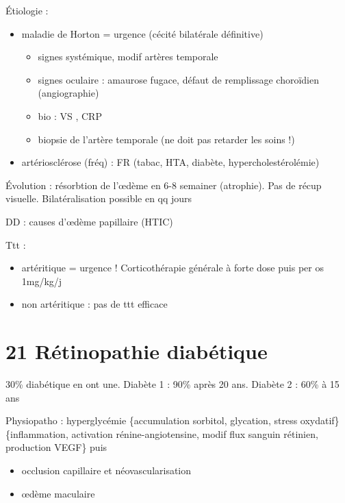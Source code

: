 \documentclass[11pt]{article}
\begin{document}
Étiologie : 
\begin{itemize}
\item maladie de Horton = urgence \skull (cécité bilatérale définitive) \thus 
\begin{itemize}
\item signes systémique, modif artères temporale
\item signes oculaire : amaurose fugace, défaut de remplissage choroïdien (angiographie)
\item bio : VS \inc[fn:24] , CRP \inc
\item biopsie de l'artère temporale (ne doit pas retarder les soins !)
\end{itemize}
\item artériosclérose (fréq) : FR (tabac, HTA, diabète, hypercholestérolémie)
\end{itemize}

Évolution : résorbtion de l'\oe{}dème en 6-8 semainer (atrophie). Pas de récup
visuelle. Bilatéralisation possible en qq jours \danger

DD : causes d'\oe{}dème papillaire (HTIC)

Ttt : 
\begin{itemize}
\item artéritique = urgence ! Corticothérapie générale à forte dose puis per os
1mg/kg/j
\item non artéritique : pas de ttt efficace
\end{itemize}

\section{21 Rétinopathie diabétique}
\label{sec:org224f216}
30\% diabétique en ont une. Diabète 1 : 90\% après 20 ans. Diabète 2 : 60\% à 15
ans

Physiopatho : hyperglycémie \thus \{accumulation sorbitol, glycation, stress
oxydatif\} \thus \{inflammation, activation rénine-angiotensine, modif flux
sanguin rétinien, production VEGF\} puis 
\begin{itemize}
\item occlusion capillaire et néovascularisation
\item \oe{}dème maculaire
\end{itemize}
\end{document}
